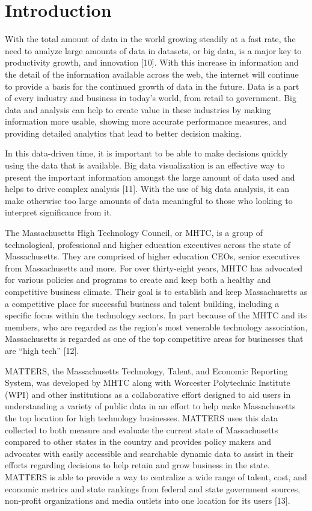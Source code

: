 \chapter{Introduction}

With the total amount of data in the world growing steadily at a fast rate, the need to analyze large amounts of data in datasets, or big data, is a major key to productivity growth, and innovation [10]. With this increase in information and the detail of the information available across the web, the internet will continue to provide a basis for the continued growth of data in the future. Data is a part of every industry and business in today’s world, from retail to government. Big data and analysis can help to create value in these industries by making information more usable, showing more accurate performance measures, and providing detailed analytics that lead to better decision making.

In this data-driven time, it is important to be able to make decisions quickly using the data that is available. Big data visualization is an effective way to present the important information amongst the large amount of data used and helps to drive complex analysis [11]. With the use of big data analysis, it can make otherwise too large amounts of data meaningful to those who looking to interpret significance from it.

The Massachusetts High Technology Council, or MHTC, is a group of technological, professional and higher education executives across the state of Massachusetts. They are comprised of higher education CEOs, senior executives from Massachusetts and more. For over thirty-eight years, MHTC has advocated for various policies and programs to create and keep both a healthy and competitive business climate. Their goal is to establish and keep Massachusetts as a competitive place for successful business and talent building, including a specific focus within the technology sectors. In part because of the MHTC and its members, who are regarded as the region’s most venerable technology association, Massachusetts is regarded as one of the top competitive areas for businesses that are “high tech” [12].

MATTERS, the Massachusetts Technology, Talent, and Economic Reporting System, was developed by MHTC along with Worcester Polytechnic Institute (WPI) and other institutions as a collaborative effort designed to aid users in understanding a variety of public data in an effort to help make Massachusetts the top location for high technology businesses. MATTERS uses this data collected to both measure and evaluate the current state of Massachusetts compared to other states in the country and provides policy makers and advocates with easily accessible and searchable dynamic data to assist in their efforts regarding decisions to help  retain and grow business in the state. MATTERS is able to provide a way to centralize a wide range of talent, cost, and economic metrics and state rankings from federal and state government sources, non-profit organizations and media outlets into one location for its users [13]. 

